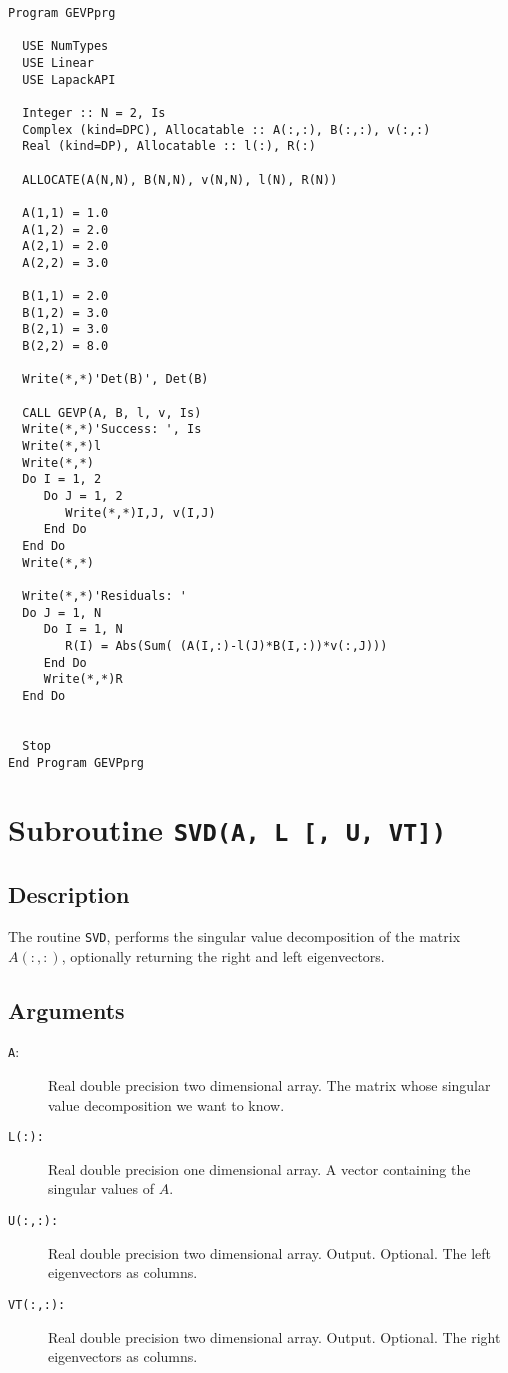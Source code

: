 \begin{lstlisting}[emph=GEVP,
                   emphstyle=\color{blue},
                   frame=trBL,
                   caption=Using lapack library to solve a generalized
                   eigenvalue problem.,
                   label=gevp]
Program GEVPprg

  USE NumTypes
  USE Linear
  USE LapackAPI

  Integer :: N = 2, Is
  Complex (kind=DPC), Allocatable :: A(:,:), B(:,:), v(:,:)
  Real (kind=DP), Allocatable :: l(:), R(:)

  ALLOCATE(A(N,N), B(N,N), v(N,N), l(N), R(N))

  A(1,1) = 1.0
  A(1,2) = 2.0
  A(2,1) = 2.0
  A(2,2) = 3.0

  B(1,1) = 2.0
  B(1,2) = 3.0
  B(2,1) = 3.0
  B(2,2) = 8.0

  Write(*,*)'Det(B)', Det(B)

  CALL GEVP(A, B, l, v, Is)
  Write(*,*)'Success: ', Is
  Write(*,*)l
  Write(*,*)
  Do I = 1, 2
     Do J = 1, 2
        Write(*,*)I,J, v(I,J)
     End Do
  End Do
  Write(*,*)

  Write(*,*)'Residuals: '
  Do J = 1, N
     Do I = 1, N
        R(I) = Abs(Sum( (A(I,:)-l(J)*B(I,:))*v(:,J)))
     End Do
     Write(*,*)R
  End Do


  Stop
End Program GEVPprg
\end{lstlisting}

\section{Subroutine \texttt{SVD(A, L [, U, VT])}}

\subsection{Description}

The routine \texttt{SVD}, performs the singular value decomposition of
the matrix $A(:,:)$, optionally returning the right and left
eigenvectors. 

\subsection{Arguments}

\begin{description}
\item[\texttt{A}:]  Real double precision two dimensional array. The
  matrix whose singular value decomposition we want to know.

\item[\texttt{L(:): }] Real double precision one dimensional array. A
  vector containing the singular values of $A$.

\item[\texttt{U(:,:):}] Real double precision two dimensional
  array. Output. Optional. The left eigenvectors as columns.

\item[\texttt{VT(:,:):}] Real double precision two dimensional
  array. Output. Optional. The right eigenvectors as columns.
\end{description}

